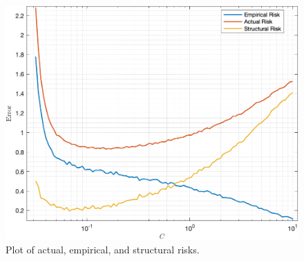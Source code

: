 \documentclass[11pt]{article}
\begin{document}
\begin{figure}[ht]
    \centering
    \includegraphics[width=\textwidth]{Risk.png}
    \vspace{-1em}\caption{Plot of actual, empirical, and structural risks.}
    \label{fig:Risks}
\end{figure}
\end{document}
